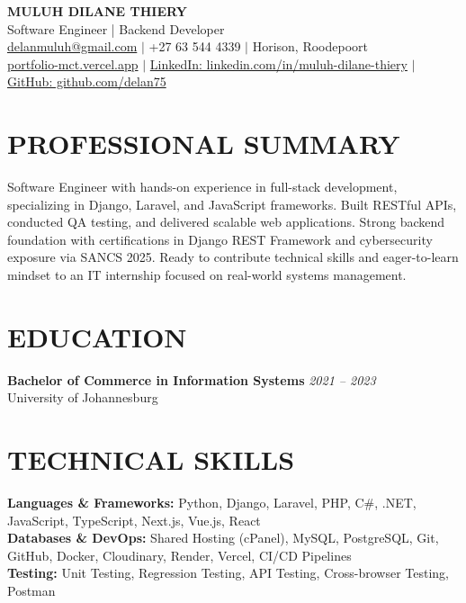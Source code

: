 \documentclass[9pt,a4paper]{article}
\begin{document}
\begin{center}
    {\Large\textbf{MULUH DILANE THIERY}}\\[2pt]
    {Software Engineer | Backend Developer}\\[4pt]
    \small
    \href{mailto:delnamuluh@gmail.com}{delanmuluh@gmail.com} $|$ 
    +27 63 544 4339 $|$ 
    Horison, Roodepoort\\[1pt]
    \href{https://portfolio-mct.vercel.app}{portfolio-mct.vercel.app} $|$ 
    \href{https://linkedin.com/in/muluh-dilane-thiery}{LinkedIn: linkedin.com/in/muluh-dilane-thiery} $|$ 
    \href{https://github.com/delan75}{GitHub: github.com/delan75}
\end{center}

\vspace{-8pt}

\section*{PROFESSIONAL SUMMARY}
\small
Software Engineer with hands-on experience in full-stack development, specializing in Django, Laravel, and JavaScript frameworks. Built RESTful APIs, conducted QA testing, and delivered scalable web applications. Strong backend foundation with certifications in Django REST Framework and cybersecurity exposure via SANCS 2025. Ready to contribute technical skills and eager-to-learn mindset to an IT internship focused on real-world systems management.

\vspace{-2pt}

\section*{EDUCATION}
\small
\textbf{Bachelor of Commerce in Information Systems} \hfill \textit{2021 -- 2023}\\
University of Johannesburg \\[-2pt]

\vspace{-2pt}

\section*{TECHNICAL SKILLS}
\small
\textbf{Languages \& Frameworks:} Python, Django, Laravel, PHP, C\#, .NET, JavaScript, TypeScript, Next.js, Vue.js, React\\
\textbf{Databases \& DevOps:} Shared Hosting (cPanel), MySQL, PostgreSQL, Git, GitHub, Docker, Cloudinary, Render, Vercel, CI/CD Pipelines\\
\textbf{Testing:} Unit Testing, Regression Testing, API Testing, Cross-browser Testing, Postman
\end{document}
